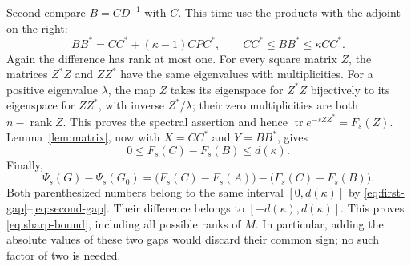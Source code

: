\documentclass[11pt]{article}
\newcommand{\tr}{\operatorname{tr}}
\newcommand{\rank}{\operatorname{rank}}
\begin{document}
Second compare $B=CD^{-1}$ with $C$. This time use the products
with the adjoint on the right:
\begin{equation}\label{eq:right-comparison}
 BB^*=CC^*+(\kappa-1)CPC^*,
 \qquad CC^*\leq BB^*\leq\kappa CC^*.
\end{equation}
Again the difference has rank at most one. For every square matrix
$Z$, the matrices $Z^*Z$ and $ZZ^*$ have the same eigenvalues with
multiplicities. For a positive eigenvalue $\lambda$, the map $Z$
takes its eigenspace for $Z^*Z$ bijectively to its eigenspace for
$ZZ^*$, with inverse $Z^*/\lambda$; their zero multiplicities are
both $n-\rank Z$. This proves the spectral assertion and hence
$\tr e^{-sZZ^*}=F_s(Z)$. Lemma~\ref{lem:matrix}, now with
$X=CC^*$ and $Y=BB^*$, gives
\begin{equation}\label{eq:second-gap}
 0\leq F_s(C)-F_s(B)\leq d(\kappa).
\end{equation}
Finally,
\begin{equation}\label{eq:difference-of-gaps}
 \Psi_s(G)-\Psi_s(G_0)
 =\bigl(F_s(C)-F_s(A)\bigr)
  -\bigl(F_s(C)-F_s(B)\bigr).
\end{equation}
Both parenthesized numbers belong to the same interval
$[0,d(\kappa)]$ by \eqref{eq:first-gap}--\eqref{eq:second-gap}.
Their difference belongs to $[-d(\kappa),d(\kappa)]$.
This proves \eqref{eq:sharp-bound}, including all possible ranks of
$M$. In particular, adding the absolute values of these two gaps
would discard their common sign; no such factor of two is needed.
\end{document}
